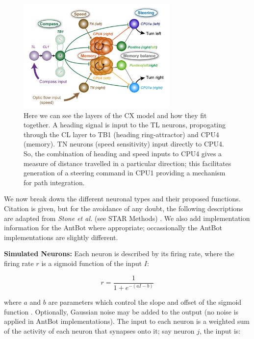 \documentclass[a4paper,11pt,twoside,openright]{article}
\begin{document}
\begin{figure}[h!]
  \centering
  \includegraphics[width=0.7\textwidth]{Figure5F}
  \caption{
    \label{fig:cxlayer} Here we can see the layers of the CX model and
    how they fit together. A heading signal is input to the TL neurons,
    propogating through the CL layer to TB1 (heading ring-attractor) and
    CPU4 (memory). TN neurons (speed sensitivity) input directly to CPU4.
    So, the combination of heading and speed inputs to CPU4 gives a measure
    of distance travelled in a particular direction; this facilitates generation
    of a steering command in CPU1 providing a mechanism for path integration.
  }
\end{figure}

We now break down the different neuronal types and their proposed functions.
Citation is given, but for the avoidance of any doubt, the following descriptions
are adapted from \textit{Stone et al.} (see STAR Methods) \cite{Stone2017}.
We also add implementation information for the AntBot where appropriate;
occassionally the AntBot implementations are slightly different.
\newline
\par

\textbf{Simulated Neurons:}
Each neuron is described by its firing rate, where the firing rate $r$ is
a sigmoid function of the input $I$:

\begin{equation}
r = \frac{1}{1 + e^{-(aI - b)}}
\end{equation}

where $a$ and $b$ are parameters which control the slope and offset of
the sigmoid function \cite{Stone2017}. Optionally, Gaussian noise may
be added to the output (no noise is applied in AntBot
implementations). The input to each neuron is a weighted sum of the
activity of each neuron that synapses onto it; say neuron $j$, the
input is:
\end{document}
